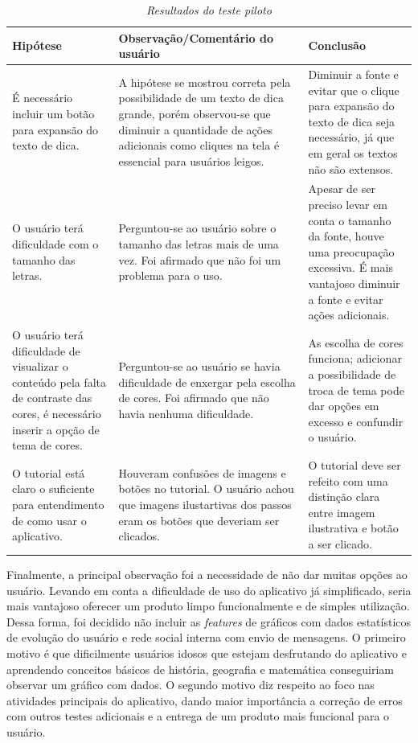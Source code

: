 \begin{table}[H]
\centering
\caption{\textit{Resultados do teste piloto}}
\centering
\footnotesize
\begin{tabular}{p{5cm} p{5cm} p{5cm}}
\toprule
\textbf{Hipótese} & \textbf{Observação/Comentário do usuário} & \textbf{Conclusão}                                   
\\ \midrule
É necessário incluir um botão para expansão 
do texto de dica.
& 
A hipótese se mostrou correta pela possibilidade de um texto de dica grande, porém observou-se que diminuir a quantidade de ações adicionais como cliques na tela é essencial para usuários leigos.
&
Diminuir a fonte e evitar que o clique para expansão do texto de dica seja necessário, já que em geral os textos não são extensos.
\\ \midrule
O usuário terá dificuldade com o tamanho das letras.
& 
Perguntou-se ao usuário sobre o tamanho das letras mais de uma vez. Foi afirmado que não foi um problema para o uso.
&
Apesar de ser preciso levar em conta o tamanho da fonte, houve uma preocupação excessiva. 
É mais vantajoso diminuir a fonte e evitar ações adicionais.
\\ \midrule
O usuário terá dificuldade de visualizar o 
conteúdo pela falta de contraste das cores, é necessário inserir a opção de tema de cores.
& 
Perguntou-se ao usuário se havia dificuldade de enxergar pela escolha de cores. Foi afirmado que não havia nenhuma dificuldade.
&
As escolha de cores funciona; adicionar a possibilidade de troca de tema pode dar opções em excesso e
 confundir o usuário.
\\ \midrule
O tutorial está claro o suficiente para entendimento de como usar o aplicativo.
&
Houveram confusões de imagens e botões
no tutorial. O usuário achou que imagens 
ilustartivas dos passos eram os botões que 
deveriam ser clicados.
&
O tutorial deve ser refeito com uma distinção clara entre imagem ilustrativa e botão a ser clicado.
\\ \midrule
\end{tabular}
\label{tab:feedback-teste-piloto}
\end{table}

Finalmente, a principal observação foi a necessidade de não dar muitas opções ao usuário. Levando em conta a dificuldade de uso do aplicativo já simplificado, seria mais vantajoso oferecer um produto limpo funcionalmente e de simples utilização. Dessa forma, foi decidido não incluir as \textit{features} de gráficos com 
dados estatísticos de evolução do usuário e rede social interna
com envio de mensagens. O primeiro motivo é que dificilmente
usuários idosos que estejam desfrutando do aplicativo e 
aprendendo conceitos básicos de história, geografia e
matemática conseguiriam observar um gráfico com dados.
O segundo motivo diz respeito ao foco nas atividades principais do aplicativo, dando maior importância a correção de erros com outros testes adicionais e a entrega de um produto mais funcional para o usuário. 

